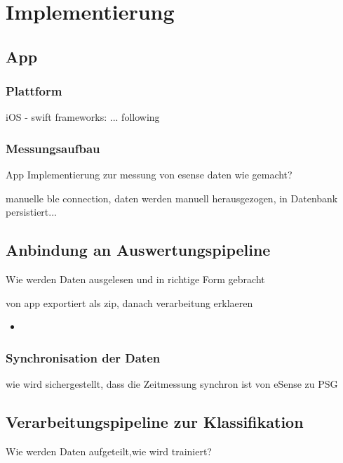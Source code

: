 \chapter{Implementierung}
\label{ch:Implementierung}

\section{App}
\subsection{Plattform}
iOS - swift
frameworks: ... following

\subsection{Messungsaufbau}
App Implementierung zur messung von esense daten wie gemacht?

manuelle ble connection, daten werden manuell herausgezogen, in Datenbank persistiert... 



\section{Anbindung an Auswertungspipeline}
Wie werden Daten ausgelesen und in richtige Form gebracht

von app exportiert als zip, danach verarbeitung erklaeren

\begin{itemize}
    \item 
\end{itemize}

\subsection{Synchronisation der Daten}
wie wird sichergestellt, dass die Zeitmessung synchron ist von eSense zu PSG

\section{Verarbeitungspipeline zur Klassifikation}
Wie werden Daten aufgeteilt,wie wird trainiert?
